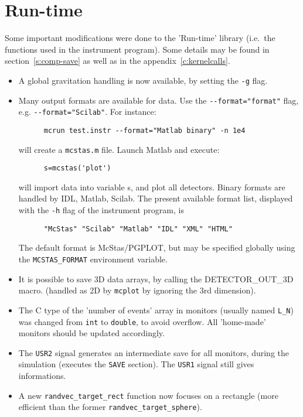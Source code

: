 \section{Run-time} 
\label{s:new-features:run-time}

Some important modifications were done to the 'Run-time' library 
(i.e.\ the functions used in the instrument program). 
Some details may be found in section~\ref{s:comp-save} 
as well as in the appendix~\ref{c:kernelcalls}.

\begin{itemize}
\item A global gravitation handling is now available, by setting the \verb+-g+ flag.
\item Many output formats are available for data. Use the \verb+--format="format"+
    flag, e.g. \verb+--format="Scilab"+. For instance:
    \begin{verbatim}
      mcrun test.instr --format="Matlab binary" -n 1e4
    \end{verbatim}
    will create a \verb+mcstas.m+ file. Launch Matlab and execute:
    \begin{verbatim}
      s=mcstas('plot')
    \end{verbatim}
    will import data into variable s, and plot all detectors.
    Binary formats are handled by IDL, Matlab, Scilab.
    The present available format list, displayed with
    the \verb+-h+ flag of the instrument program, is
    \begin{verbatim}
      "McStas" "Scilab" "Matlab" "IDL" "XML" "HTML" 
    \end{verbatim}
    The default format is McStas/PGPLOT, but may be specified globally using
    the \verb+MCSTAS_FORMAT+ environment variable. 
     
\item It is possible to save 3D data arrays, by calling the DETECTOR\_OUT\_3D macro.
    (handled as 2D by \verb+mcplot+ by ignoring the 3rd dimension). 
\item The C type of the 'number of events' array in monitors (usually named
    \verb+L_N+) was changed from \verb+int+ to \verb+double+, to avoid overflow.
    All 'home-made' monitors should be updated accordingly.
\item The \verb+USR2+ signal generates an intermediate save for all monitors, during
    the simulation (executes the \texttt{SAVE} section). The \verb+USR1+ signal still
    gives informations. 
\item A new \verb+randvec_target_rect+ function now focuses on a rectangle (more
    efficient than the former \verb+randvec_target_sphere+).
\end{itemize}


